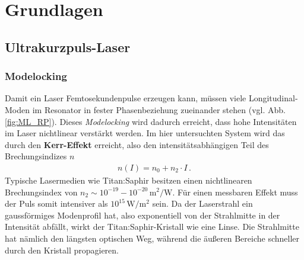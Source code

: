 \documentclass[bachelor,       %
               twoside,        %
               BCOR10mm,       %
               liststotoc,nomtotoc,bibtotoc, %
               english,ngerman, %
               final,          %
               ]{GAUBM}
\begin{document}
\chapter{Grundlagen}

\section{Ultrakurzpuls-Laser}
\subsection{Modelocking}
Damit ein Laser Femtosekundenpulse erzeugen kann, müssen viele Longitudinal-Moden im Resonator in fester Phasenbeziehung zueinander stehen (vgl. Abb.\ref{fig:ML_RP}).
Dieses \emph{Modelocking} wird dadurch erreicht, dass hohe Intensitäten im Laser nichtlinear verstärkt werden.
Im hier untersuchten System wird das durch den \textbf{Kerr-Effekt} erreicht, also den intensitätsabhängigen Teil des Brechungsindizes $n$ \cite[S.165]{agrawal_nonlinear_2001}
\begin{align}
	n(I)=n_0+n_2\cdot I\,.
	\label{eq:kerr}
\end{align}
Typische Lasermedien wie Titan:Saphir besitzen einen nichtlinearen Brechungsindex von $n_2\sim 10^{-19}-10^{-20}\,\si{\meter^2\per\watt}$.
Für einen messbaren Effekt muss der Puls somit intensiver als $10^{15}\,\si{\watt\per\meter^2}$ sein.
Da der Laserstrahl ein gaussförmiges Modenprofil hat, also exponentiell von der Strahlmitte in der Intensität abfällt, wirkt der Titan:Saphir-Kristall wie eine Linse.
Die Strahlmitte hat nämlich den längsten optischen Weg, während die äußeren Bereiche schneller durch den Kristall propagieren.
\end{document}
